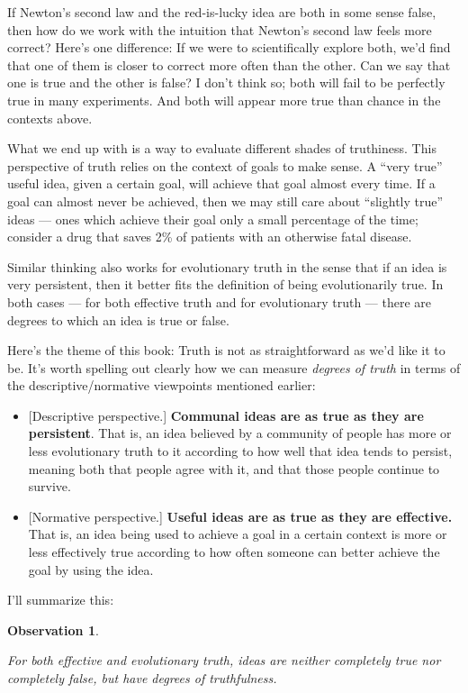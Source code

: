 \documentclass[9pt, twoside]{book}
\newtheorem{obs}{Observation}
\theoremstyle{argtstyle}
\begin{document}
If Newton's second law and the
red-is-lucky idea are both in some sense false, then
how do we work with the intuition that
Newton's second law feels more correct?
Here's one difference: If we were to scientifically
explore both, we'd find that one of them is closer to
correct more often than the other.
Can we say that one is true and the other is false? I don't think so;
both will fail to be perfectly true in many experiments. And both will appear
more true than chance in the contexts above.

What we end up with is a way to evaluate different shades of truthiness.
This perspective of truth relies on the context of goals to make sense.
A ``very true'' useful idea, given
a certain goal, will achieve that goal almost every time. If a goal can
almost never be achieved, then we may still care about ``slightly true'' ideas
--- ones which achieve their goal only a small percentage of the time;
consider a drug that saves 2\% of patients with an otherwise fatal disease.

Similar thinking also works for evolutionary truth in the sense that if an idea
is very persistent, then it better fits the definition of being evolutionarily
true. In both cases --- for both effective truth and for evolutionary truth ---
there are degrees to which an idea is true or false.

Here's the theme of this book:
Truth is not as straightforward as we'd like it to be.
It's worth spelling out clearly how we can
measure {\em degrees of truth} in terms of
the descriptive/normative viewpoints mentioned earlier:
\begin{itemize}
    \item{} [Descriptive perspective.]
        {\bf Communal ideas are as true as they are
        persistent}.
        That is, an idea believed by a community of people has
        more or less evolutionary truth to it according to how well that
        idea tends to persist, meaning both that people agree with it, and
        that those people continue to survive.
    \item{} [Normative perspective.]
        {\bf Useful ideas are as true as they are effective.}
        That is, an idea being used to achieve a goal in a certain context
        is more or less effectively true according to how often someone can
        better achieve the goal by using the idea.
\end{itemize}

I'll summarize this:
\newcommand{\obstwo}{
    For both
    effective and evolutionary truth,
    ideas are neither completely true nor completely false, but have degrees of
    truthfulness.
}
\begin{obs}\label{o2}
    \obstwo
\end{obs}
\end{document}
